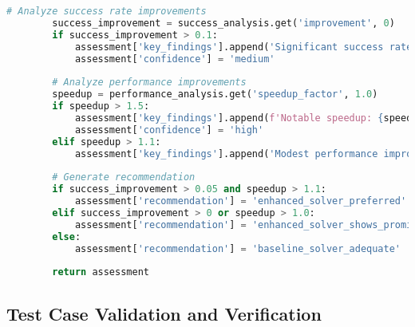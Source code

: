 \begin{lstlisting}[language=Python, caption=Statistical Analysis and Comparison Framework]
        # Analyze success rate improvements
        success_improvement = success_analysis.get('improvement', 0)
        if success_improvement > 0.1:
            assessment['key_findings'].append('Significant success rate improvement')
            assessment['confidence'] = 'medium'
        
        # Analyze performance improvements
        speedup = performance_analysis.get('speedup_factor', 1.0)
        if speedup > 1.5:
            assessment['key_findings'].append(f'Notable speedup: {speedup:.2f}x')
            assessment['confidence'] = 'high'
        elif speedup > 1.1:
            assessment['key_findings'].append('Modest performance improvement')
        
        # Generate recommendation
        if success_improvement > 0.05 and speedup > 1.1:
            assessment['recommendation'] = 'enhanced_solver_preferred'
        elif success_improvement > 0 or speedup > 1.0:
            assessment['recommendation'] = 'enhanced_solver_shows_promise'
        else:
            assessment['recommendation'] = 'baseline_solver_adequate'
        
        return assessment
\end{lstlisting}

\subsection{Test Case Validation and Verification}
\label{appendix:test-validation}

